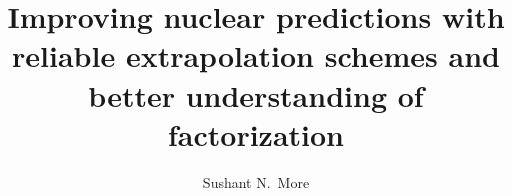 \documentclass[11pt, phd]{osudissert96}
\title{
	\texorpdfstring{
		Improving nuclear predictions with reliable extrapolation schemes and
		better understanding of factorization
	}{
		Improving nuclear predictions with reliable extrapolation schemes and
		better understanding of factorization
	}
}
\author{Sushant N.\ More}
\begin{document}
\maketitle
\disscopyright
\clearpage


\dedication{To the memory of my late grandparents, who valued integrity and
 education above everything else.}



\tableofcontents

\clearpage
\listoffigures

\clearpage



\startdoublespace











\appendix
% 

\end{document}
